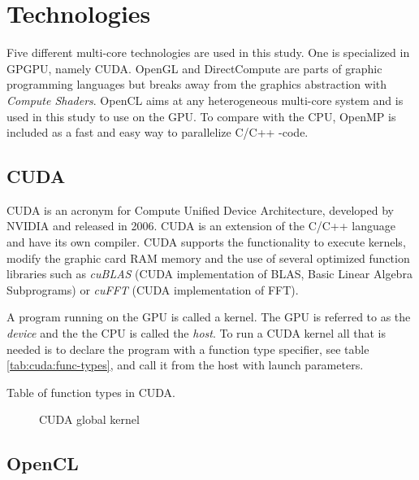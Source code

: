 \chapter{Technologies}

Five different multi-core technologies are used in this study. One is specialized in GPGPU, namely CUDA. OpenGL and DirectCompute are parts of graphic programming languages but breaks away from the graphics abstraction with \textit{Compute Shaders}. OpenCL aims at any heterogeneous multi-core system and is used in this study to use on the GPU. To compare with the CPU, OpenMP is included as a fast and easy way to parallelize C/C++ -code.

\section{CUDA}

CUDA is an acronym for Compute Unified Device Architecture, developed by NVIDIA and released in 2006. CUDA is an extension of the C/C++ language and have its own compiler. CUDA supports the functionality to execute kernels, modify the graphic card RAM memory and the use of several optimized function libraries such as \textit{cuBLAS} (CUDA implementation of BLAS, Basic Linear Algebra Subprograms) or \textit{cuFFT} (CUDA implementation of FFT).

A program running on the GPU is called a kernel. The GPU is referred to as the \textit{device} and the the CPU is called the \textit{host}. To run a CUDA kernel all that is needed is to declare the program with a function type specifier, see table \ref{tab:cuda:func-types}, and call it from the host with launch parameters.

\begin{table}
	\centering
	
	\caption{Table of function types in CUDA.}
	\label{tab:cuda:func-types}
\end{table}

\begin{figure}
	\centering
	\begin{framed}
		
	\end{framed}
	\caption{CUDA global kernel}
	\label{lst:sample:global:cu}	
\end{figure}

\section{OpenCL}

